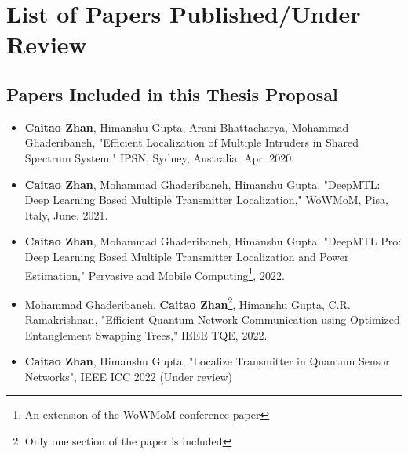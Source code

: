 \chapter{List of Papers Published/Under Review}

\section*{Papers Included in this Thesis Proposal}
\begin{itemize}
    \item \textbf{Caitao Zhan}, Himanshu Gupta, Arani Bhattacharya, Mohammad Ghaderibaneh, "Efficient Localization of Multiple Intruders in Shared Spectrum System," IPSN, Sydney, Australia, Apr. 2020.

    \item \textbf{Caitao Zhan}, Mohammad Ghaderibaneh, Himanshu Gupta, "DeepMTL: Deep Learning Based Multiple Transmitter Localization," WoWMoM, Pisa, Italy, June. 2021. 

    \item \textbf{Caitao Zhan}, Mohammad Ghaderibaneh, Himanshu Gupta, "DeepMTL Pro: Deep Learning Based Multiple Transmitter Localization and Power Estimation," Pervasive and Mobile Computing\footnote{An extension of the WoWMoM conference paper}, 2022.

    \item Mohammad Ghaderibaneh, \textbf{Caitao Zhan}\footnote{Only one section of the paper is included}, Himanshu Gupta, C.R. Ramakrishnan, "Efficient Quantum Network Communication using Optimized Entanglement Swapping Trees," IEEE TQE, 2022.

    \item \textbf{Caitao Zhan}, Himanshu Gupta, "Localize Transmitter in Quantum Sensor Networks", IEEE ICC 2022 (Under review)

\end{itemize}

